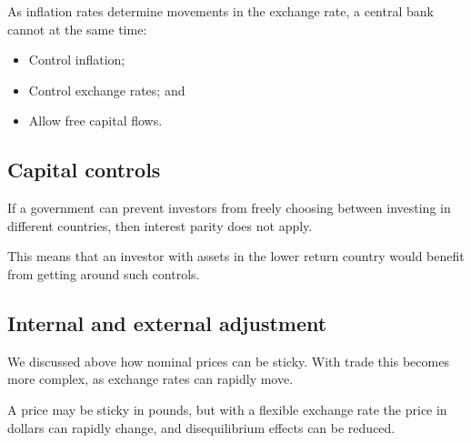 As inflation rates determine movements in the exchange rate, a central bank cannot at the same time:

\begin{itemize}
\item Control inflation;
\item Control exchange rates; and
\item Allow free capital flows.
\end{itemize}

\subsection{Capital controls}

If a government can prevent investors from freely choosing between investing in different countries, then interest parity does not apply.

This means that an investor with assets in the lower return country would benefit from getting around such controls.

\subsection{Internal and external adjustment}

We discussed above how nominal prices can be sticky. With trade this becomes more complex, as exchange rates can rapidly move.

A price may be sticky in pounds, but with a flexible exchange rate the price in dollars can rapidly change, and disequilibrium effects can be reduced.

